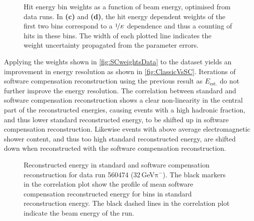 \documentclass[twoside,a4paper,12pt]{article}
\newcommand\piminus{\(\mathrm{\pi^-}\)}
\begin{document}
\begin{figure}[htbp]
	\caption{Hit energy bin weights as a function of beam energy, optimised from data runs. In \textbf{(c)} and \textbf{(d)}, the hit energy dependent weights of the first two bins correspond to a $\nicefrac{1}{E}$ dependence and thus a counting of hits in these bins. The width of each plotted line indicates the weight uncertainty propagated from the parameter errors.}
	\label{fig:SCweightsData}
\end{figure}

Applying the weights shown in \autoref{fig:SCweightsData} to the dataset yields an improvement in energy resolution as shown in \autoref{fig:ClassicVsSC}. Iterations of software compensation reconstruction using the previous result as $E_\text{est.}$ do not further improve the energy resolution.  The correlation between standard and software compensation reconstruction shows a clear non-linearity in the central part of the reconstructed energies, causing events with a high hadronic fraction, and thus lower standard reconstructed energy, to be shifted up in software compensation reconstruction. Likewise events with above average electromagnetic shower content, and thus too high standard reconstructed energy, are shifted down when reconstructed with the software compensation reconstruction.
\begin{figure}[htbp]
	\hfill
	
	\caption{Reconstructed energy in standard and software compensation reconstruction for data run 560474 (32\,GeV\piminus). The black markers in the correlation plot show the profile of mean software compensation reconstructed energy for bins in standard reconstruction energy. The black dashed lines in the correlation plot indicate the beam energy of the run.}
	\label{fig:ClassicVsSC}
\end{figure}
\end{document}
